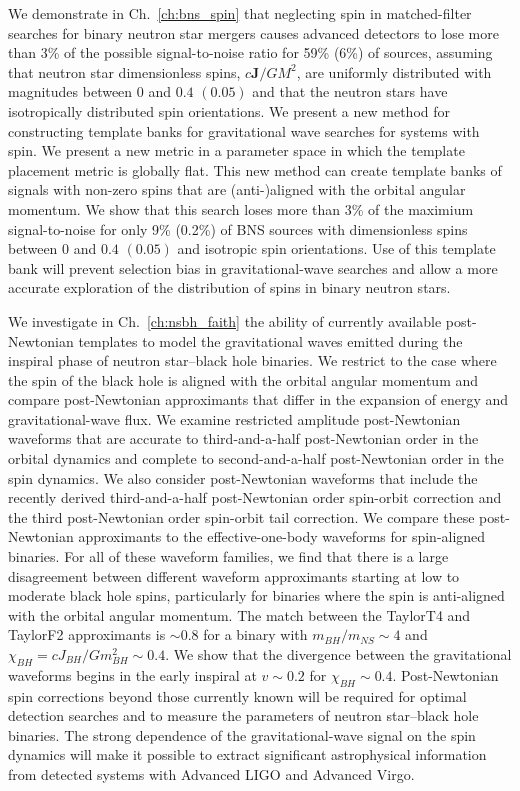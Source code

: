 We demonstrate in Ch.~\ref{ch:bns_spin} that neglecting spin in matched-filter searches for binary
neutron star mergers causes advanced detectors
to lose more than 3\% of the possible signal-to-noise ratio for 59\% (6\%) of
sources, assuming that neutron star dimensionless spins, $c\mathbf{J}/GM^2$, are uniformly distributed
with magnitudes between $0$ and $0.4$ $(0.05)$ and that the neutron stars
have isotropically distributed spin orientations.
We present a new method for constructing template banks for gravitational
wave searches for systems with spin. We present a new metric in a parameter
space in which the template placement metric is globally flat.
This new method can create template banks of signals with
non-zero spins that are (anti-)aligned with the orbital angular momentum.  We show that this search loses more than
3\% of the maximium signal-to-noise for only 9\% (0.2\%) of BNS sources with dimensionless spins between $0$ and $0.4$ $(0.05)$ and isotropic spin orientations. Use of this
template bank will prevent selection bias in gravitational-wave searches and
allow a more accurate exploration of the distribution of spins in binary
neutron stars.

We investigate in Ch.~\ref{ch:nsbh_faith} the ability of currently available
post-Newtonian templates to model the gravitational waves emitted during the
inspiral phase of neutron star--black hole binaries. We restrict to the case where the spin of the
black hole is aligned with the orbital angular momentum and compare
post-Newtonian approximants that differ in the expansion of energy and gravitational-wave flux. We examine
restricted amplitude post-Newtonian waveforms that are accurate to
third-and-a-half post-Newtonian order in the orbital dynamics and complete to second-and-a-half post-Newtonian order
in the spin dynamics. We also consider post-Newtonian waveforms that include the recently derived third-and-a-half
post-Newtonian order spin-orbit correction and the third post-Newtonian order spin-orbit tail correction. 
We compare these post-Newtonian approximants to the effective-one-body waveforms for spin-aligned binaries.
For all of these waveform families, we find that
 there is a large disagreement between
different waveform approximants starting at low to moderate black hole spins,
particularly for binaries where the spin is anti-aligned with the orbital
angular momentum. The match between the TaylorT4 and TaylorF2 approximants is $\sim 0.8$ for a binary with $m_{BH}/m_{NS} \sim 4$ and 
$\chi_{BH} = cJ_{BH}/Gm^2_{BH} \sim 0.4$.
We show that the divergence between the gravitational waveforms begins in the early
inspiral at $v \sim 0.2$ for $\chi_{BH} \sim 0.4$.  Post-Newtonian spin corrections beyond those currently
known will be required for optimal detection searches and to measure the
parameters of neutron star--black hole binaries. The strong dependence of 
the gravitational-wave signal on the spin dynamics will make it possible to extract significant
astrophysical information from detected systems with Advanced LIGO and
Advanced Virgo.

